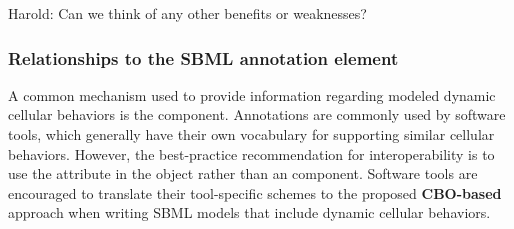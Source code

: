 {\color{red} Harold: \notice Can we think of any other benefits or weaknesses?}

\subsubsection{Relationships to the SBML annotation element}
\label{subsubsec:CBO&Annot}

A common mechanism used to provide information regarding modeled dynamic cellular behaviors is the  \Annotation component. Annotations are commonly used by software tools, which generally have their own vocabulary for supporting similar cellular behaviors. However, the best-practice recommendation for interoperability is to use the  attribute in the \Event object rather than an \Annotation component. Software tools are encouraged to translate their tool-specific \Annotation schemes to the proposed \textbf{CBO-based} approach when writing SBML models that include dynamic cellular behaviors.
